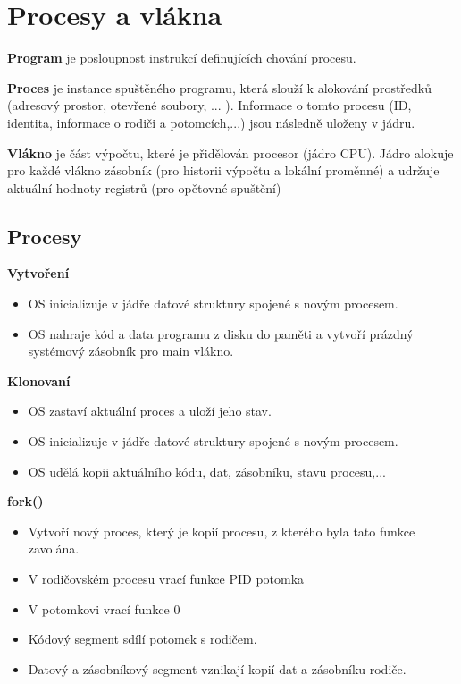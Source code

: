 \documentclass{szzclass}
\author{Daniel Hampl}
\begin{document}

\tableofcontents
\newpage


\section{Procesy a vlákna}

\textbf{Program}
je posloupnost instrukcí definujících chování procesu.

\textbf{Proces}
je instance spuštěného programu, která
slouží k alokování prostředků (adresový prostor, otevřené soubory, ... ).
Informace o tomto procesu (ID, identita, informace o rodiči a potomcích,...) jsou následně uloženy v jádru.

\textbf{Vlákno}
je část výpočtu, které je přidělován procesor (jádro CPU).
Jádro alokuje pro každé vlákno zásobník (pro historii výpočtu a lokální proměnné) a udržuje aktuální hodnoty registrů (pro opětovné spuštění)

\subsection{Procesy}
\textbf{Vytvoření}
\begin{itemize}
    \item OS inicializuje v jádře datové struktury spojené s novým procesem.
    \item OS nahraje kód a data programu z disku do paměti a vytvoří prázdný systémový zásobník pro main vlákno.
\end{itemize}

\textbf{Klonovaní}
\begin{itemize}
    \item OS zastaví aktuální proces a uloží jeho stav.
    \item OS inicializuje v jádře datové struktury spojené s novým procesem.
    \item OS udělá kopii aktuálního kódu, dat, zásobníku, stavu procesu,...
\end{itemize}

\textbf{fork()}
\begin{itemize}
    \item Vytvoří nový proces, který je kopií procesu, z kterého byla tato funkce zavolána.
    \item V rodičovském procesu vrací funkce PID potomka
    \item V potomkovi vrací funkce 0
    \item Kódový segment sdílí potomek s rodičem.
    \item Datový a zásobníkový segment vznikají kopií dat a zásobníku rodiče.
\end{itemize}
\end{document}
